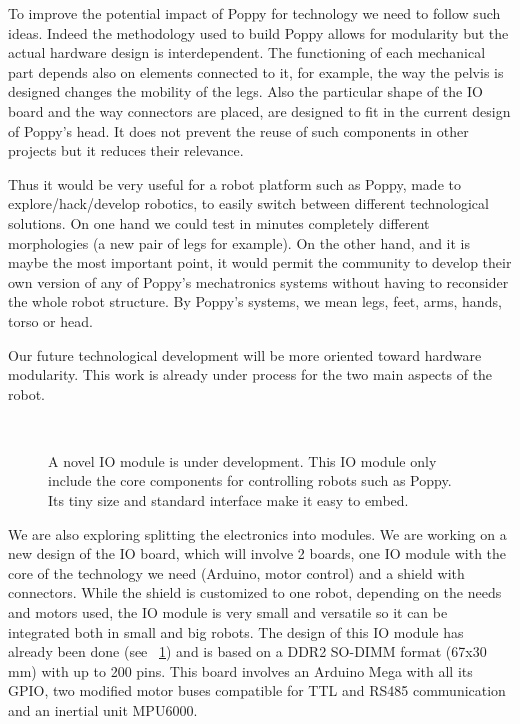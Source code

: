 To improve the potential impact of Poppy for technology we need to follow such ideas. Indeed the methodology used to build Poppy allows for modularity but the actual hardware design is interdependent. The functioning of each mechanical part depends also on elements connected to it, for example, the way the pelvis is designed changes the mobility of the legs. Also the particular shape of the IO board and the way connectors are placed, are designed to fit in the current design of Poppy's head. It does not prevent the reuse of such components in other projects but it reduces their relevance.

Thus it would be very useful for a robot platform such as Poppy, made to explore/hack/develop robotics, to easily switch between different technological solutions. On one hand we could test in minutes completely different morphologies (a new pair of legs for example). On the other hand, and it is maybe the most important point, it would permit the community to develop their own version of any of Poppy's mechatronics systems without having to reconsider the whole robot structure. By Poppy's systems, we mean legs, feet, arms, hands, torso or head.


Our future technological development will be more oriented toward hardware modularity. This work is already under process for the two main aspects of the robot.

\begin{figure}[tb]
\centering
    \hfil
     \\
    \caption{A novel IO module is under development. This IO module only include the core components for controlling robots such as Poppy. Its tiny size and standard interface make it easy to embed.}
    \label{fig:poppy-electronic-modularity}
\end{figure}

We are also exploring splitting the electronics into modules. We are working on a new design of the IO board, which will involve 2 boards, one IO module with the core of the technology we need (Arduino, motor control) and a shield with connectors.
While the shield is customized to one robot, depending on the needs and motors used, the IO module is very small and versatile so it can be integrated both in small and big robots.
The design of this IO module has already been done (see \figurename~\ref{fig:poppy-electronic-modularity}) and is based on a DDR2 SO-DIMM format (67x30 mm) with up to 200 pins. This board involves an Arduino Mega with all its GPIO, two modified motor buses compatible for TTL and RS485 communication and an inertial unit MPU6000.


